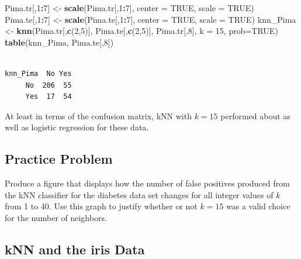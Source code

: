 \documentclass[
]{krantz}
\makeatletter
\newenvironment{Shaded}{\begin{snugshade}}{\end{snugshade}}
\newcommand{\DataTypeTok}[1]{\textcolor[rgb]{0.27,0.27,0.27}{#1}}
\newcommand{\DecValTok}[1]{\textcolor[rgb]{0.06,0.06,0.06}{#1}}
\newcommand{\KeywordTok}[1]{\textcolor[rgb]{0.27,0.27,0.27}{\textbf{#1}}}
\newcommand{\NormalTok}[1]{#1}
\newcommand{\OperatorTok}[1]{\textcolor[rgb]{0.43,0.43,0.43}{\textbf{#1}}}
\newcommand{\OtherTok}[1]{\textcolor[rgb]{0.37,0.37,0.37}{#1}}
\newcommand{\StringTok}[1]{\textcolor[rgb]{0.5,0.5,0.5}{#1}}
\newenvironment{kframe}{%
\medskip{}
\setlength{\fboxsep}{.8em}
 \def\at@end@of@kframe{}%
 \ifinner\ifhmode%
  \def\at@end@of@kframe{\end{minipage}}%
  \begin{minipage}{\columnwidth}%
 \fi\fi%
 \def\FrameCommand##1{\hskip\@totalleftmargin \hskip-\fboxsep
 \colorbox{shadecolor}{##1}\hskip-\fboxsep
     \hskip-\linewidth \hskip-\@totalleftmargin \hskip\columnwidth}%
 \MakeFramed {\advance\hsize-\width
   \@totalleftmargin\z@ \linewidth\hsize
   \@setminipage}}%
 {\par\unskip\endMakeFramed%
 \at@end@of@kframe}
\renewenvironment{Shaded}{\begin{kframe}}{\end{kframe}}
\makeatother
\begin{document}
\begin{Shaded}
\begin{Highlighting}[]
\NormalTok{Pima.tr[,}\DecValTok{1}\OperatorTok{:}\DecValTok{7}\NormalTok{] \textless{}{-}}\StringTok{ }\KeywordTok{scale}\NormalTok{(Pima.tr[,}\DecValTok{1}\OperatorTok{:}\DecValTok{7}\NormalTok{], }\DataTypeTok{center =} \OtherTok{TRUE}\NormalTok{, }\DataTypeTok{scale =} \OtherTok{TRUE}\NormalTok{)}
\NormalTok{Pima.te[,}\DecValTok{1}\OperatorTok{:}\DecValTok{7}\NormalTok{] \textless{}{-}}\StringTok{ }\KeywordTok{scale}\NormalTok{(Pima.te[,}\DecValTok{1}\OperatorTok{:}\DecValTok{7}\NormalTok{], }\DataTypeTok{center =} \OtherTok{TRUE}\NormalTok{, }\DataTypeTok{scale =} \OtherTok{TRUE}\NormalTok{)}
\NormalTok{knn\_Pima \textless{}{-}}\StringTok{ }\KeywordTok{knn}\NormalTok{(Pima.tr[,}\KeywordTok{c}\NormalTok{(}\DecValTok{2}\NormalTok{,}\DecValTok{5}\NormalTok{)], Pima.te[,}\KeywordTok{c}\NormalTok{(}\DecValTok{2}\NormalTok{,}\DecValTok{5}\NormalTok{)], Pima.tr[,}\DecValTok{8}\NormalTok{], }\DataTypeTok{k =} \DecValTok{15}\NormalTok{, }\DataTypeTok{prob=}\OtherTok{TRUE}\NormalTok{)}
\KeywordTok{table}\NormalTok{(knn\_Pima, Pima.te[,}\DecValTok{8}\NormalTok{])}
\end{Highlighting}
\end{Shaded}

\begin{verbatim}
        
knn_Pima  No Yes
     No  206  55
     Yes  17  54
\end{verbatim}

At least in terms of the confusion matrix, kNN with \(k=15\) performed about as well as logistic regression for these data.

\hypertarget{classPP1}{%
\subsection{Practice Problem}\label{classPP1}}

Produce a figure that displays how the number of false positives produced from the kNN classifier for the diabetes data set changes for all integer values of \(k\) from 1 to 40. Use this graph to justify whether or not \(k = 15\) was a valid choice for the number of neighbors.

\hypertarget{knn-and-the-iris-data}{%
\subsection{kNN and the iris Data}\label{knn-and-the-iris-data}}
\end{document}
